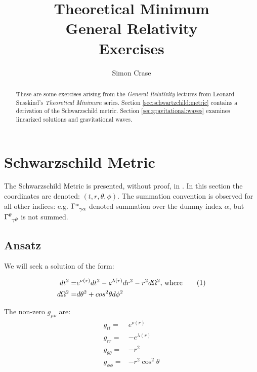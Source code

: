 \documentclass[]{article}
\title{Theoretical Minimum\\General Relativity\\Exercises}
\author{Simon Crase}
\newcommand\numberthis{\addtocounter{equation}{1}\tag{\theequation}}
\begin{document}
\maketitle

\begin{abstract}
	These are some exercises arising from the \emph{General Relativity}\cite{susskind2012general} lectures from Leonard Susskind's \emph{Theoretical Minimum} series\cite{susskind2007theoretical}. Section \ref{sec:schwartzchild:metric} contains a derivation of the Schwarzschild metric. Section \ref{sec:gravitational:waves} examines linearized solutions and gravitational waves.
\end{abstract}

\tableofcontents
\listoffigures
\listoftables
\listoftheorems

	
\section{Schwarzschild Metric}\label{sec:schwartzchild:metric}

The Schwarzschild Metric is presented, without proof, in \cite[Lecture 6]{susskind2012general}. In this section the coordinates are denoted: $(t,r,\theta,\phi)$. The summation convention is observed for all other indices: e.g. $\Gamma\indices{^\alpha_{\gamma\alpha}}$ denoted summation over the dummy index $\alpha$, but $\Gamma\indices{^\theta_{\gamma\theta}}$ is not summed.

\subsection{Ansatz}
We will seek a solution of the form\cite{Adler1965Introduction}:

\begin{align*}
	dt^2 =& e^{\nu(r)} dt^2 -e^{\lambda(r)} dr^2 -r^2 d \Omega^2 \text{, where} \numberthis \label{eq:schwartzschild:ansatz}\\
	d \Omega^2 =&d\theta^2 + cos^2 \theta d\phi^2 
\end{align*}

The  non-zero $g_{\mu\nu}$ are:
\begin{align*}
	g_{tt}=& e^{\nu(r)}\\
	g_{rr}=&-e^{\lambda(r)}\\
	g_{\theta\theta}=&-r^2\\
	g_{\phi\phi}=&-r^2 \cos^2 \theta\\
\end{align*}
\end{document}
